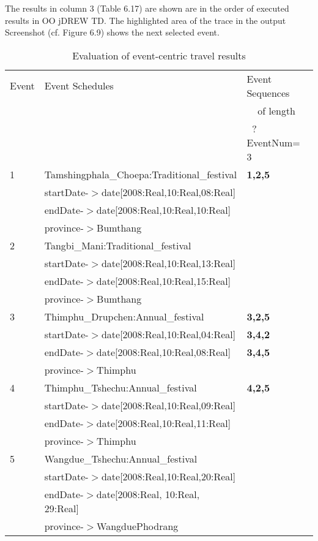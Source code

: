 \hspace{0.3in}The results in column 3 (Table 6.17) are shown are in the order of executed results in OO jDREW TD. The highlighted area of the trace in the output Screenshot (cf. Figure 6.9) shows the next selected event. 

\begin{table} [tbph]
\caption{Evaluation of event-centric travel results}
\centering
\footnotesize
\begin{tabular}{|l|l|l|}
\hline
Event &Event Schedules &Event Sequences\\
 & & $~~~~~$of length\\
 & &$~$ ?EventNum= 3\\
\hline
  1  &Tamshingphala\_Choepa:Traditional\_festival&\textbf{1,2,5}\\
     &startDate-$>$date[2008:Real,10:Real,08:Real]&\\
   &endDate-$>$date[2008:Real,10:Real,10:Real]&\\
   &province-$>$Bumthang&\\
\hline
  2  &Tangbi\_Mani:Traditional\_festival&\\
     &startDate-$>$date[2008:Real,10:Real,13:Real]&\\
   &endDate-$>$date[2008:Real,10:Real,15:Real]&\\
   &province-$>$Bumthang&\\
\hline
  3  &Thimphu\_Drupchen:Annual\_festival&\textbf{3,2,5}\\
     &startDate-$>$date[2008:Real,10:Real,04:Real]&\textbf{3,4,2}\\
   &endDate-$>$date[2008:Real,10:Real,08:Real]&\textbf{3,4,5}\\
   &province-$>$Thimphu&\\
\hline
 4  &Thimphu\_Tshechu:Annual\_festival&\textbf{4,2,5}\\
     &startDate-$>$date[2008:Real,10:Real,09:Real]&\\
   &endDate-$>$date[2008:Real,10:Real,11:Real]&\\
   &province-$>$Thimphu&\\
\hline
 5  &Wangdue\_Tshechu:Annual\_festival&\\
     &startDate-$>$date[2008:Real,10:Real,20:Real]&\\
   &endDate-$>$date[2008:Real, 10:Real, 29:Real]&\\
   &province-$>$WangduePhodrang&\\
\hline
\end{tabular} 
\end{table} 


